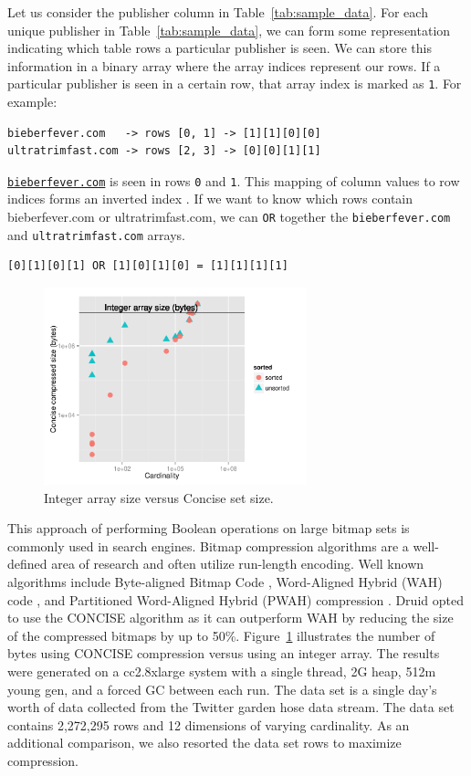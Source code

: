 \documentclass{vldb}
\begin{document}
Let us consider the publisher column in
Table~\ref{tab:sample_data}. For each unique publisher in
Table~\ref{tab:sample_data}, we can form some representation
indicating which table rows a particular publisher is seen. We can
store this information in a binary array where the array indices
represent our rows. If a particular publisher is seen in a certain
row, that array index is marked as \texttt{1}. For example:
\begin{verbatim}
bieberfever.com   -> rows [0, 1] -> [1][1][0][0]
ultratrimfast.com -> rows [2, 3] -> [0][0][1][1]
\end{verbatim}

\texttt{\href{http://bieberfever.com}{bieberfever.com}} is seen in rows \texttt{0} and \texttt{1}. This mapping of column values
to row indices forms an inverted index \cite{tomasic1993performance}. If we want to know which
rows contain {\ttfamily bieberfever.com} or {\ttfamily ultratrimfast.com}, we can \texttt{OR} together
the \texttt{bieberfever.com} and \texttt{ultratrimfast.com} arrays.
\begin{verbatim}
[0][1][0][1] OR [1][0][1][0] = [1][1][1][1]
\end{verbatim}

\begin{figure}
\centering
\includegraphics[width = 3in]{concise_plot}
\caption{Integer array size versus Concise set size.}
\label{fig:concise_plot}
\end{figure}

This approach of performing Boolean operations on large bitmap sets is
commonly used in search engines. Bitmap compression algorithms are a
well-defined area of research and often utilize run-length
encoding. Well known algorithms include Byte-aligned Bitmap Code \cite{antoshenkov1995byte},
Word-Aligned Hybrid (WAH) code \cite{wu2006optimizing}, and Partitioned Word-Aligned
Hybrid (PWAH) compression \cite{van2011memory}. Druid opted to use the CONCISE
algorithm \cite{colantonio2010concise} as it can outperform WAH by reducing the size of the
compressed bitmaps by up to 50\%.  Figure~\ref{fig:concise_plot} illustrates the number of
bytes using CONCISE compression versus using an integer array. The
results were generated on a cc2.8xlarge system with a single thread,
2G heap, 512m young gen, and a forced GC between each run. The data
set is a single day’s worth of data collected from the Twitter garden
hose \cite{twitter2013} data stream. The data set contains 2,272,295 rows and 12
dimensions of varying cardinality. As an additional comparison, we
also resorted the data set rows to maximize compression.
\end{document}
